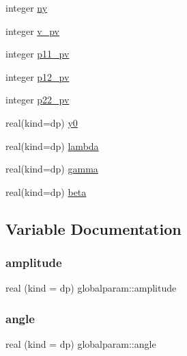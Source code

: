\begin{DoxyCompactItemize}
integer \mbox{\hyperlink{namespaceglobalparam_ae3e17c94b4a693ce99dc99ca85e3aba5}{ny}}
\item 
integer \mbox{\hyperlink{namespaceglobalparam_a980a183375fbe21d1ba02b3611dcc94d}{v\+\_\+pv}}
\item 
integer \mbox{\hyperlink{namespaceglobalparam_a454092edac459f96bb9045ced3f632bd}{p11\+\_\+pv}}
\item 
integer \mbox{\hyperlink{namespaceglobalparam_a9d0f6eb467ec66a6825d64e743f0fc36}{p12\+\_\+pv}}
\item 
integer \mbox{\hyperlink{namespaceglobalparam_a1c0b88f532e0bb8c21c4aa92a92405ca}{p22\+\_\+pv}}
\item 
real(kind=dp) \mbox{\hyperlink{namespaceglobalparam_a6192d97c147b8b0f5ebda79933dd6f16}{y0}}
\item 
real(kind=dp) \mbox{\hyperlink{namespaceglobalparam_afcf85dea7c5d650ef77d480eb6d2a614}{lambda}}
\item 
real(kind=dp) \mbox{\hyperlink{namespaceglobalparam_a22c2013f9cb1fb03d79e99fc038d55d1}{gamma}}
\item 
real(kind=dp) \mbox{\hyperlink{namespaceglobalparam_a71ed33aead9f8bd6716557281b189e3c}{beta}}
\end{DoxyCompactItemize}


\subsection{Variable Documentation}
\mbox{\label{namespaceglobalparam_ad4de2aae56528f5e68832e367c812b7e}} 
\subsubsection{\texorpdfstring{amplitude}{amplitude}}
{\footnotesize\ttfamily real (kind = dp) globalparam\+::amplitude}

\mbox{\label{namespaceglobalparam_afc46f9587744d04e67298c60303cd5f0}} 
\subsubsection{\texorpdfstring{angle}{angle}}
{\footnotesize\ttfamily real (kind = dp) globalparam\+::angle}


